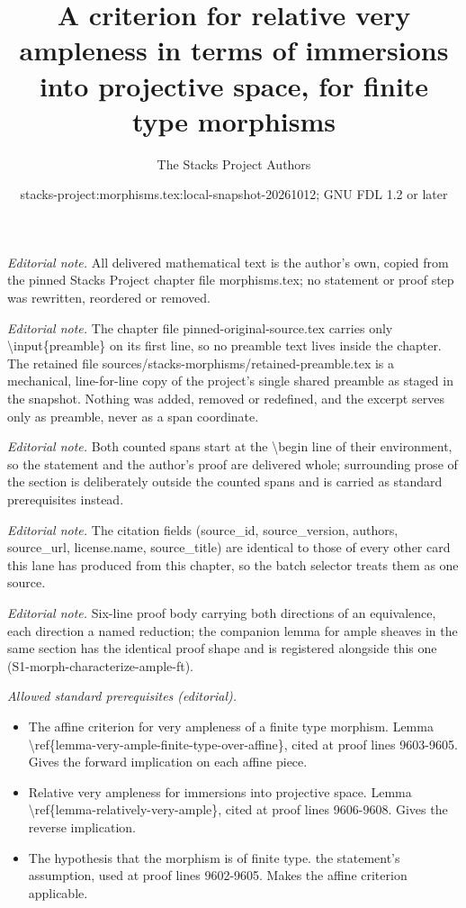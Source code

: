 \documentclass[10pt,a4paper]{amsart}
\title{A criterion for relative very ampleness in terms of immersions into projective space, for finite type morphisms}
\author{The Stacks Project Authors}
\date{stacks-project:morphisms.tex:local-snapshot-20261012; GNU FDL 1.2 or later}
\theoremstyle{plain}
\theoremstyle{definition}
\theoremstyle{remark}
\numberwithin{equation}{subsection}
\begin{document}
\maketitle
\setcounter{subsection}{1}
\noindent\textit{Editorial note.} All delivered mathematical text is the author's own, copied from the pinned Stacks Project chapter file morphisms.tex; no statement or proof step was rewritten, reordered or removed.\par\medskip
\noindent\textit{Editorial note.} The chapter file pinned-original-source.tex carries only \textbackslash{}input\{preamble\} on its first line, so no preamble text lives inside the chapter. The retained file sources/stacks-morphisms/retained-preamble.tex is a mechanical, line-for-line copy of the project's single shared preamble as staged in the snapshot. Nothing was added, removed or redefined, and the excerpt serves only as preamble, never as a span coordinate.\par\medskip
\noindent\textit{Editorial note.} Both counted spans start at the \textbackslash{}begin line of their environment, so the statement and the author's proof are delivered whole; surrounding prose of the section is deliberately outside the counted spans and is carried as standard prerequisites instead.\par\medskip
\noindent\textit{Editorial note.} The citation fields (source\_id, source\_version, authors, source\_url, license.name, source\_title) are identical to those of every other card this lane has produced from this chapter, so the batch selector treats them as one source.\par\medskip
\noindent\textit{Editorial note.} Six-line proof body carrying both directions of an equivalence, each direction a named reduction; the companion lemma for ample sheaves in the same section has the identical proof shape and is registered alongside this one (S1-morph-characterize-ample-ft).\par\medskip
\noindent\textit{Allowed standard prerequisites (editorial).}\begin{itemize}
\item The affine criterion for very ampleness of a finite type morphism. Lemma \textbackslash{}ref\{lemma-very-ample-finite-type-over-affine\}, cited at proof lines 9603-9605. Gives the forward implication on each affine piece.
\item Relative very ampleness for immersions into projective space. Lemma \textbackslash{}ref\{lemma-relatively-very-ample\}, cited at proof lines 9606-9608. Gives the reverse implication.
\item The hypothesis that the morphism is of finite type. the statement's assumption, used at proof lines 9602-9605. Makes the affine criterion applicable.
\end{itemize}\medskip
\end{document}

